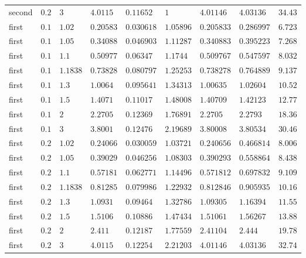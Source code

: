 \documentclass[aps,prd,onecolumn,superscriptaddress,nofootinbib,floatfix,longbibliography]{revtex4-2}
\begin{document}
\begin{table}[!htbp]
\begin{tabular}{lllllllll}
second & $0.2$ & $3$ & $4.0115$ & $0.11652$ & $1$ & $4.01146$ & $4.03136$ & $34.43$ \\
first & $0.1$ & $1.02$ & $0.20583$ & $0.030618$ & $1.05896$ & $0.205833$ & $0.286997$ & $6.723$ \\
first & $0.1$ & $1.05$ & $0.34088$ & $0.046903$ & $1.11287$ & $0.340883$ & $0.395223$ & $7.268$ \\
first & $0.1$ & $1.1$ & $0.50977$ & $0.06347$ & $1.1744$ & $0.509767$ & $0.547597$ & $8.032$ \\
first & $0.1$ & $1.1838$ & $0.73828$ & $0.080797$ & $1.25253$ & $0.738278$ & $0.764889$ & $9.137$ \\
first & $0.1$ & $1.3$ & $1.0064$ & $0.095641$ & $1.34313$ & $1.00635$ & $1.02604$ & $10.52$ \\
first & $0.1$ & $1.5$ & $1.4071$ & $0.11017$ & $1.48008$ & $1.40709$ & $1.42123$ & $12.77$ \\
first & $0.1$ & $2$ & $2.2705$ & $0.12369$ & $1.76891$ & $2.2705$ & $2.2793$ & $18.36$ \\
first & $0.1$ & $3$ & $3.8001$ & $0.12476$ & $2.19689$ & $3.80008$ & $3.80534$ & $30.46$ \\
first & $0.2$ & $1.02$ & $0.24066$ & $0.030059$ & $1.03721$ & $0.240656$ & $0.466814$ & $8.006$ \\
first & $0.2$ & $1.05$ & $0.39029$ & $0.046256$ & $1.08303$ & $0.390293$ & $0.558864$ & $8.438$ \\
first & $0.2$ & $1.1$ & $0.57181$ & $0.062771$ & $1.14496$ & $0.571812$ & $0.697832$ & $9.109$ \\
first & $0.2$ & $1.1838$ & $0.81285$ & $0.079986$ & $1.22932$ & $0.812846$ & $0.905935$ & $10.16$ \\
first & $0.2$ & $1.3$ & $1.0931$ & $0.09464$ & $1.32786$ & $1.09305$ & $1.16394$ & $11.55$ \\
first & $0.2$ & $1.5$ & $1.5106$ & $0.10886$ & $1.47434$ & $1.51061$ & $1.56267$ & $13.88$ \\
first & $0.2$ & $2$ & $2.411$ & $0.12187$ & $1.77559$ & $2.41104$ & $2.444$ & $19.78$ \\
first & $0.2$ & $3$ & $4.0115$ & $0.12254$ & $2.21203$ & $4.01146$ & $4.03136$ & $32.74$ \\
\hline\hline
\end{tabular}\par
\endgroup
\end{table}

\end{document}
